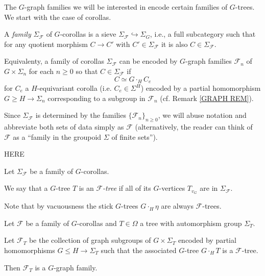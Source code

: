 \documentclass[a4paper,10pt]{article}%
\begin{document}
The $G$-graph families we will be interested in encode certain families of $G$-trees. We start with the case of corollas.


\begin{definition}
  A \textit{family} $\Sigma_{\mathcal{F}}$ of $G$-corollas is a sieve 
  $\Sigma_{\mathcal{F}} \hookrightarrow \Sigma_G$, i.e., a full subcategory such that for any quotient morphism $C \to C'$ with $C' \in \Sigma_{\mathcal{F}}$ it is also $C \in \Sigma_{\mathcal{F}}$.
\end{definition}

\begin{remark}
  Equivalenty, a family of corollas $\Sigma_{\mathcal{F}}$
  can be encoded by
  $G$-graph families $\mathcal{F}_n$ of $G \times \Sigma_n$ for each $n \geq 0$ so that $C \in \Sigma_{\mathcal{F}}$ if 
  \[C \simeq G \cdot_H C_e\]
  for $C_e$ a $H$-equivariant corolla 
  (i.e. $C_e \in \Sigma^H$)
  encoded by a partial homomorphism $G \geq H \to \Sigma_n$ corresponding to a subgroup in $\mathcal{F}_n$ 
  (cf. Remark \ref{GRAPH REM}). 
\end{remark}

Since $\Sigma_{\mathcal{F}}$ is determined by the families $\{\mathcal{F}_n\}_{n \geq 0}$, we will abuse notation and abbreviate both sets of data simply as $\mathcal{F}$ (alternatively, the reader can think of $\mathcal{F}$ as a ``family in the groupoid $\Sigma$ of finite sets''). 

{\color{red} HERE}

\begin{definition}
  Let $\Sigma_{\mathcal{F}}$ be a family of $G$-corollas.

  We say that a $G$-tree $T$ is an \textit{$\mathcal{F}$-tree}
  if all of its $G$-vertices $T_{v_G}$ are in 
  $\Sigma_{\mathcal{F}}$.
\end{definition}



\begin{remark}\label{VACUOUSNESS REM}
  Note that by vacuousness the stick $G$-trees $G \cdot_H \eta$ are always $\mathcal{F}$-trees.
\end{remark}

\begin{proposition}
  Let $\mathcal{F}$ be a family of $G$-corollas and $T \in \Omega$ a tree with automorphism group $\Sigma_T$.
  
  Let $\mathcal{F}_T$ be the collection of graph subgroups of 
  $G \times \Sigma_T$ encoded by partial homomorphisms
  $G \leq H \to \Sigma_T$ such that the associated $G$-tree
  $G \cdot_H T$ is a $\mathcal{F}$-tree.
  
  Then $\mathcal{F}_T$ is a $G$-graph family.
\end{proposition}
\end{document}
